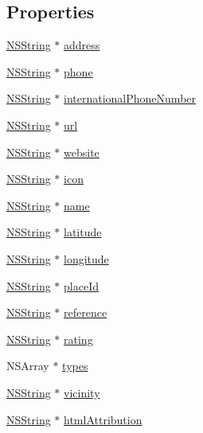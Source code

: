 \subsection*{\-Properties}
\begin{DoxyCompactItemize}
\item 
\hyperlink{class_n_s_string}{\-N\-S\-String} $\ast$ \hyperlink{interface_place_a832b0495b67e2346b5fba0aa14411614}{address}
\item 
\hyperlink{class_n_s_string}{\-N\-S\-String} $\ast$ \hyperlink{interface_place_a532b02a6b215477a915fa25c83f234e9}{phone}
\item 
\hyperlink{class_n_s_string}{\-N\-S\-String} $\ast$ \hyperlink{interface_place_a64a2dcf828339a43c48ef78899ba58ff}{international\-Phone\-Number}
\item 
\hyperlink{class_n_s_string}{\-N\-S\-String} $\ast$ \hyperlink{interface_place_a0f5159a6b5a5fbf452e34168ba5d47c7}{url}
\item 
\hyperlink{class_n_s_string}{\-N\-S\-String} $\ast$ \hyperlink{interface_place_ae95d94e85f00267531f3c2e9f8fcb2e6}{website}
\item 
\hyperlink{class_n_s_string}{\-N\-S\-String} $\ast$ \hyperlink{interface_place_ae5f037aae27648446210ea2cb169888e}{icon}
\item 
\hyperlink{class_n_s_string}{\-N\-S\-String} $\ast$ \hyperlink{interface_place_af99652dd0d40e83f60290c882f5983b2}{name}
\item 
\hyperlink{class_n_s_string}{\-N\-S\-String} $\ast$ \hyperlink{interface_place_a3fa592e20c76add7e6740a0e4a39b5be}{latitude}
\item 
\hyperlink{class_n_s_string}{\-N\-S\-String} $\ast$ \hyperlink{interface_place_a02f51bc8df25434f2618863412b886ea}{longitude}
\item 
\hyperlink{class_n_s_string}{\-N\-S\-String} $\ast$ \hyperlink{interface_place_adb7bb39042ba9a4b3ab51fe359d8516b}{place\-Id}
\item 
\hyperlink{class_n_s_string}{\-N\-S\-String} $\ast$ \hyperlink{interface_place_a4e56379341365b0ad18f3483a8004a42}{reference}
\item 
\hyperlink{class_n_s_string}{\-N\-S\-String} $\ast$ \hyperlink{interface_place_acc697f7cd0e08b8f48a3c0808d7b0098}{rating}
\item 
\-N\-S\-Array $\ast$ \hyperlink{interface_place_acf5d2d2b9bf43d6afb225992d4222811}{types}
\item 
\hyperlink{class_n_s_string}{\-N\-S\-String} $\ast$ \hyperlink{interface_place_aef36487d4eb51ba31be7aeafd16317ee}{vicinity}
\item 
\hyperlink{class_n_s_string}{\-N\-S\-String} $\ast$ \hyperlink{interface_place_a3edcc3b6106235c7726ea9878eaf0755}{html\-Attribution}
\end{DoxyCompactItemize}


